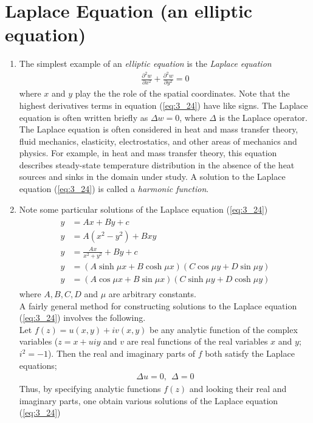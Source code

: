 \documentclass[11pt]{report}
\newcommand{\sps}{\\[0.2cm]}
\newcommand{\refn}[1]{(\ref{#1})}
\newcommand{\refx}[1]{\refn{eq:#1}}
\begin{document}
	\section{Laplace Equation (an elliptic equation)}
	\begin{enumerate}
		\item The simplest example of an \textit{elliptic equation} is the \textit{Laplace equation}
		\begin{eqnarray}
			\frac{\partial^2 w}{\partial x^2} + \frac{\partial^2 w}{\partial y^2} = 0\label{eq:3_24}
		\end{eqnarray}
		where $x$ and $y$ play the the role of the spatial coordinates. Note that the highest derivatives terms in equation \refx{3_24} have like signs. The Laplace equation is often written briefly as $\Delta w = 0$, where $\Delta$ is the Laplace operator.\\
		
		The Laplace equation is often considered in heat and mass transfer theory, fluid mechanics, elasticity, electrostatics, and other areas of mechanics and physics. For example, in heat and mass transfer theory, this equation describes steady-state temperature distribution in the absence of the heat sources and sinks in the domain under study. A solution to the Laplace equation \refx{3_24} is called a \textit{harmonic function}.
		
		\item Note some particular solutions of the Laplace equation \refx{3_24}
		\begin{eqnarray}
			\begin{split}
				y &= Ax + By + c\sps
				y &= A(x^2-y^2) + Bxy\sps
				y &= \frac{Ax}{x^2+y^2}+By + c\sps
				y &= (A\sinh \mu x + B\cosh\mu x)(C\cos\mu y + D\sin\mu y)\sps
				y &= (A\cos\mu x + B\sin\mu x)(C\sinh\mu y + D\cosh\mu y)
			\end{split}
		\end{eqnarray}
		where $A,B,C,D$ and $\mu$ are arbitrary constants.\\
		A fairly general method for constructing solutions to the Laplace equation \refx{3_24} involves the following.\sps
		Let $f(z)=u(x,y)+ iv(x,y)$ be any analytic function of the complex variables ($z=x+uiy$ and $v$ are real functions of the real variables $x$ and $y$; $i^2=-1$). Then the real and imaginary parts of $f$ both satisfy the Laplace equations;
		\begin{eqnarray*}
			\Delta u = 0, ~~ \Delta = 0
		\end{eqnarray*}
		Thus, by specifying analytic functions $f(z)$ and looking their real and imaginary parts, one obtain various solutions of the Laplace equation \refx{3_24}
	\end{enumerate}
	
\end{document}
